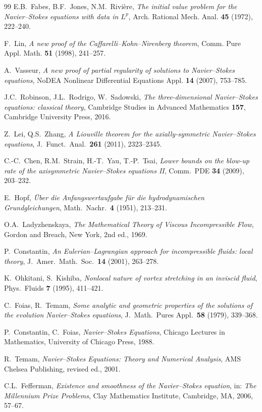 \documentclass[11pt]{article}
\theoremstyle{definition}
\theoremstyle{remark}
\begin{document}
\begin{thebibliography}{99}
E.B.~Fabes, B.F.~Jones, N.M.~Rivi\`ere,
\textit{The initial value problem for the Navier--Stokes equations with data in $L^p$},
Arch. Rational Mech. Anal. \textbf{45} (1972), 222--240.

F.~Lin,
\textit{A new proof of the Caffarelli--Kohn--Nirenberg theorem},
Comm. Pure Appl. Math. \textbf{51} (1998), 241--257.

A.~Vasseur,
\textit{A new proof of partial regularity of solutions to Navier--Stokes equations},
NoDEA Nonlinear Differential Equations Appl. \textbf{14} (2007), 753--785.

J.C.~Robinson, J.L.~Rodrigo, W.~Sadowski,
\textit{The three-dimensional Navier--Stokes equations: classical theory},
Cambridge Studies in Advanced Mathematics \textbf{157},
Cambridge University Press, 2016.

Z.~Lei, Q.S.~Zhang,
\textit{A Liouville theorem for the axially-symmetric Navier--Stokes equations},
J.\ Funct.\ Anal.\ \textbf{261} (2011), 2323--2345.

C.-C.~Chen, R.M.~Strain, H.-T.~Yau, T.-P.~Tsai,
\textit{Lower bounds on the blow-up rate of the axisymmetric Navier--Stokes
equations II},
Comm.\ PDE \textbf{34} (2009), 203--232.

E.~Hopf,
\textit{\"Uber die Anfangswertaufgabe f\"ur die hydrodynamischen
Grundgleichungen},
Math.\ Nachr.\ \textbf{4} (1951), 213--231.

O.A.~Ladyzhenskaya,
\textit{The Mathematical Theory of Viscous Incompressible Flow},
Gordon and Breach, New York, 2nd ed., 1969.

P.~Constantin,
\textit{An Eulerian--Lagrangian approach for incompressible fluids: local theory},
J.\ Amer.\ Math.\ Soc.\ \textbf{14} (2001), 263--278.

K.~Ohkitani, S.~Kishiba,
\textit{Nonlocal nature of vortex stretching in an inviscid fluid},
Phys.\ Fluids \textbf{7} (1995), 411--421.

C.~Foias, R.~Temam,
\textit{Some analytic and geometric properties of the solutions of the
evolution Navier--Stokes equations},
J.\ Math.\ Pures Appl.\ \textbf{58} (1979), 339--368.

P.~Constantin, C.~Foias,
\textit{Navier--Stokes Equations},
Chicago Lectures in Mathematics, University of Chicago Press, 1988.

R.~Temam,
\textit{Navier--Stokes Equations: Theory and Numerical Analysis},
AMS Chelsea Publishing, revised ed., 2001.

C.L.~Fefferman,
\textit{Existence and smoothness of the Navier--Stokes equation},
in: \textit{The Millennium Prize Problems}, Clay Mathematics Institute,
Cambridge, MA, 2006, 57--67.

\end{thebibliography}
\end{document}
